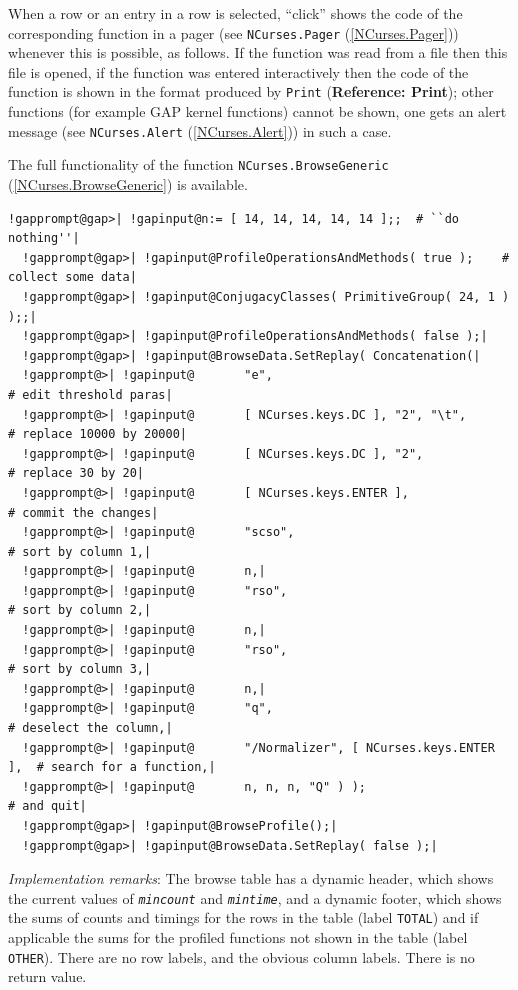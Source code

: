\documentclass[a4paper,11pt]{report}
\begin{document}
{{{ When a row or an entry in a row is selected, ``click'' shows the code of the corresponding function in a pager (see \texttt{NCurses.Pager} (\ref{NCurses.Pager})) whenever this is possible, as follows. If the function was read from a file
then this file is opened, if the function was entered interactively then the
code of the function is shown in the format produced by \texttt{Print} (\textbf{Reference: Print}); other functions (for example \textsf{GAP} kernel functions) cannot be shown, one gets an alert message (see \texttt{NCurses.Alert} (\ref{NCurses.Alert})) in such a case. 

 The full functionality of the function \texttt{NCurses.BrowseGeneric} (\ref{NCurses.BrowseGeneric}) is available. 

 
\begin{Verbatim}[commandchars=!@|,fontsize=\small,frame=single,label=Example]
  !gapprompt@gap>| !gapinput@n:= [ 14, 14, 14, 14, 14 ];;  # ``do nothing''|
  !gapprompt@gap>| !gapinput@ProfileOperationsAndMethods( true );    # collect some data|
  !gapprompt@gap>| !gapinput@ConjugacyClasses( PrimitiveGroup( 24, 1 ) );;|
  !gapprompt@gap>| !gapinput@ProfileOperationsAndMethods( false );|
  !gapprompt@gap>| !gapinput@BrowseData.SetReplay( Concatenation(|
  !gapprompt@>| !gapinput@       "e",                                    # edit threshold paras|
  !gapprompt@>| !gapinput@       [ NCurses.keys.DC ], "2", "\t",         # replace 10000 by 20000|
  !gapprompt@>| !gapinput@       [ NCurses.keys.DC ], "2",               # replace 30 by 20|
  !gapprompt@>| !gapinput@       [ NCurses.keys.ENTER ],                 # commit the changes|
  !gapprompt@>| !gapinput@       "scso",                                 # sort by column 1,|
  !gapprompt@>| !gapinput@       n,|
  !gapprompt@>| !gapinput@       "rso",                                  # sort by column 2,|
  !gapprompt@>| !gapinput@       n,|
  !gapprompt@>| !gapinput@       "rso",                                  # sort by column 3,|
  !gapprompt@>| !gapinput@       n,|
  !gapprompt@>| !gapinput@       "q",                                    # deselect the column,|
  !gapprompt@>| !gapinput@       "/Normalizer", [ NCurses.keys.ENTER ],  # search for a function,|
  !gapprompt@>| !gapinput@       n, n, n, "Q" ) );                       # and quit|
  !gapprompt@gap>| !gapinput@BrowseProfile();|
  !gapprompt@gap>| !gapinput@BrowseData.SetReplay( false );|
\end{Verbatim}
 

 \emph{Implementation remarks}: The browse table has a dynamic header, which shows the current values of \mbox{\texttt{\mdseries\slshape mincount}} and \mbox{\texttt{\mdseries\slshape mintime}}, and a dynamic footer, which shows the sums of counts and timings for the
rows in the table (label \texttt{TOTAL}) and if applicable the sums for the profiled functions not shown in the table
(label \texttt{OTHER}). There are no row labels, and the obvious column labels. There is no return
value. 

}}}
\end{document}
